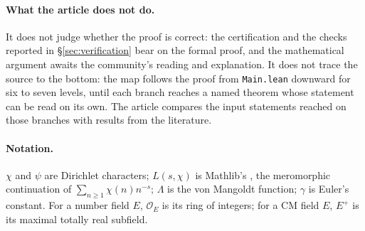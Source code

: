 \paragraph{What the article does not do.} It does not judge whether the proof is correct: the
certification and the checks reported in \S\ref{sec:verification} bear on the formal proof, and the
mathematical argument awaits the community's reading and explanation. It does not trace the source to the bottom: the map follows the proof
from \texttt{Main.lean} downward for six to seven levels, until each branch reaches a named
theorem whose statement can be read on its own. The article compares the input statements reached
on those branches with results from the literature.

\paragraph{Notation.} $\chi$ and $\psi$ are Dirichlet characters; $L(s,\chi)$ is Mathlib's
, the meromorphic continuation of
$\sum_{n\ge1}\chi(n)n^{-s}$; $\Lambda$ is the von Mangoldt function; $\gamma$ is Euler's constant.
For a number field $E$, $\mathcal O_E$ is its ring of integers; for a CM field $E$, $E^+$ is its
maximal totally real subfield.
